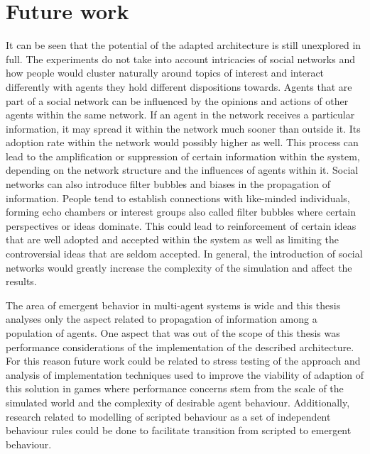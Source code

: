 \section{Future work}

It can be seen that the potential of the adapted architecture is still unexplored in full.
The experiments do not take into account intricacies of social networks and how people would cluster naturally around topics of interest and interact differently with agents they hold different dispositions towards.
Agents that are part of a social network can be influenced by the opinions and actions of other agents within the same network.
If an agent in the network receives a particular information, it may spread it within the network much sooner than outside it.
Its adoption rate within the network would possibly higher as well.
This process can lead to the amplification or suppression of certain information within the system, depending on the network structure and the influences of agents within it.
Social networks can also introduce filter bubbles and biases in the propagation of information.
People tend to establish connections with like-minded individuals, forming echo chambers or interest groups also called filter bubbles where certain perspectives or ideas dominate.
This could lead to reinforcement of certain ideas that are well adopted and accepted within the system as well as limiting the controversial ideas that are seldom accepted.
In general, the introduction of social networks would greatly increase the complexity of the simulation and affect the results.

The area of emergent behavior in multi-agent systems is wide and this thesis analyses only the aspect related to propagation of information among a population of agents.
One aspect that was out of the scope of this thesis was performance considerations of the implementation of the described architecture.
For this reason future work could be related to stress testing of the approach and analysis of implementation techniques used to improve the viability of adaption of this solution in games where performance concerns stem from the scale of the simulated world and the complexity of desirable agent behaviour.
Additionally, research related to modelling of scripted behaviour as a set of independent behaviour rules could be done to facilitate transition from scripted to emergent behaviour.

